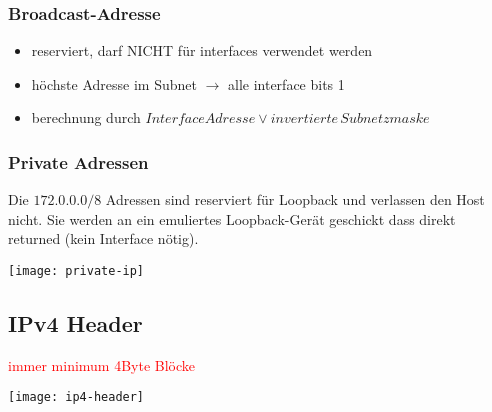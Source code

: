 \subsubsection{Broadcast-Adresse}

\begin{itemize}
	\item reserviert, darf NICHT für interfaces verwendet werden
	\item höchste Adresse im Subnet $\rightarrow$ alle interface bits 1
	\item berechnung durch $Interface Adresse \lor invertierte \, Subnetzmaske$
\end{itemize}

\subsubsection{Private Adressen}

Die $172.0.0.0/8$ Adressen sind reserviert für Loopback und verlassen den Host nicht.
Sie werden an ein emuliertes Loopback-Gerät geschickt dass direkt returned
(kein Interface nötig).
\begin{center}
	\texttt{[image: private-ip]}
\end{center}



\subsection{IPv4 Header}

\textcolor{red}{immer minimum 4Byte Blöcke}

\begin{center}
	\texttt{[image: ip4-header]}
\end{center}

